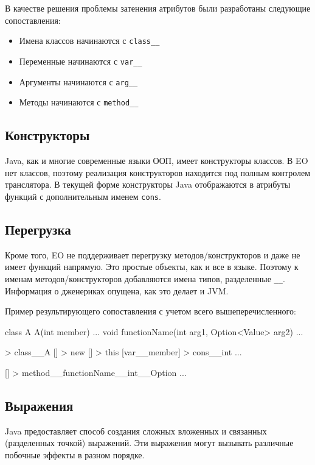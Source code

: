 \documentclass[oneside,final,14pt,a4paper]{extreport}
\theoremstyle{definition}
\theoremstyle{remark}
\theoremstyle{remark}
\begin{document}
В качестве решения проблемы затенения атрибутов были разработаны следующие сопоставления:
\begin{itemize}
  \item Имена классов начинаются с \texttt{class\_\_}
  \item Переменные начинаются с \texttt{var\_\_}
  \item Аргументы начинаются с \texttt{arg\_\_}
  \item Методы начинаются с \texttt{method\_\_}
\end{itemize}


\subsection{Конструкторы}
Java, как и многие современные языки ООП, имеет конструкторы классов. В EO нет классов, поэтому реализация конструкторов находится под полным контролем транслятора. В текущей форме конструкторы Java отображаются в атрибуты функций с дополнительным именем \texttt{cons}.


\subsection{Перегрузка}
Кроме того, EO не поддерживает перегрузку методов/конструкторов и даже не имеет функций напрямую. Это простые объекты, как и все в языке. Поэтому к именам методов/конструкторов добавляются имена типов, разделенные \texttt{\_\_}. Информация о дженериках опущена, как это делает и JVM.

Пример результирующего сопоставления с учетом всего вышеперечисленного:
\begin{ffcode}
class A {
  A(int member) {...}
  void functionName(int arg1, Option<Value> arg2) {...}
}
\end{ffcode}

\begin{ffcode}
[] > class__A
  [] > new
    [] > this
      [var__member] > cons__int
        ...

      [] > method__functionName__int__Option
        ...
\end{ffcode}

\subsection{Выражения}
Java предоставляет способ создания сложных вложенных и связанных (разделенных точкой) выражений. Эти выражения могут вызывать различные побочные эффекты в разном порядке.
\end{document}
